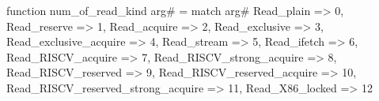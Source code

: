 function num_of_read_kind arg# = match arg# {
  Read_plain => 0,
  Read_reserve => 1,
  Read_acquire => 2,
  Read_exclusive => 3,
  Read_exclusive_acquire => 4,
  Read_stream => 5,
  Read_ifetch => 6,
  Read_RISCV_acquire => 7,
  Read_RISCV_strong_acquire => 8,
  Read_RISCV_reserved => 9,
  Read_RISCV_reserved_acquire => 10,
  Read_RISCV_reserved_strong_acquire => 11,
  Read_X86_locked => 12
}
